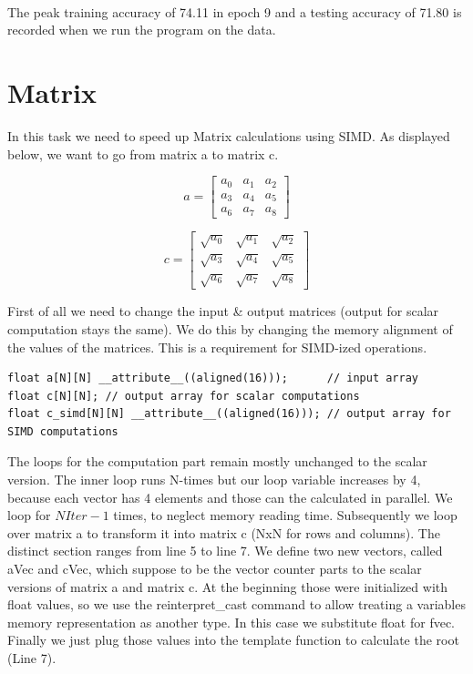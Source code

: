 \documentclass{article}
\begin{document}
\paragraph{}
The peak training accuracy of 74.11 in epoch 9 and a testing accuracy of  71.80 is recorded when we run the program on the data. 


\section{Matrix}
In this task we need to speed up Matrix calculations using SIMD.
As displayed below, we want to go from matrix a to matrix c.

\[
a = \begin{bmatrix}
a_0 & a_1 & a_2 \\
a_3 & a_4 & a_5 \\
a_6 & a_7 & a_8
\end{bmatrix}
\]

\[
c = \begin{bmatrix}
\sqrt{a_0} & \sqrt{a_1} & \sqrt{a_2} \\
\sqrt{a_3} & \sqrt{a_4} & \sqrt{a_5} \\
\sqrt{a_6} & \sqrt{a_7} & \sqrt{a_8}
\end{bmatrix}
\]
\newpage

\noindent First of all we need to change the input \& output matrices (output for scalar computation stays the same).
We do this by changing the memory alignment of the values of the matrices.
This is a requirement for SIMD-ized operations.
\begin{lstlisting}[caption=Matrix.cpp]
float a[N][N] __attribute__((aligned(16)));      // input array
float c[N][N]; // output array for scalar computations
float c_simd[N][N] __attribute__((aligned(16))); // output array for SIMD computations
\end{lstlisting}

\noindent The loops for the computation part remain mostly unchanged to the scalar version.
The inner loop runs N-times but our loop variable increases by 4, because each vector has 4 elements and those can the calculated in parallel.
We loop for $NIter - 1$ times, to neglect memory reading time.
Subsequently we loop over matrix a to transform it into matrix c (NxN for rows and columns).
The distinct section ranges from line 5 to line 7. We define two new vectors, called aVec and cVec, which suppose to be the vector counter parts to the scalar versions of matrix a and matrix c.
At the beginning those were initialized with float values, so we use the reinterpret\_cast command to allow treating
a variables memory representation as another type. In this case we substitute float for fvec.
Finally we just plug those values into the template function to calculate the root (Line 7).
\end{document}
